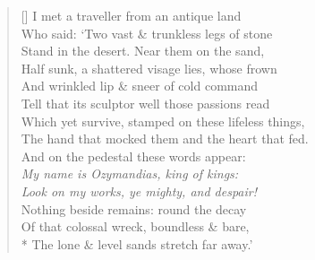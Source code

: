 \documentclass[MAIN]{subfiles}
\begin{document}
\settowidth{\versewidth}{I met a traveller from an antique land}
\begin{verse}[\versewidth]
I met a traveller from an antique land\\
Who said: `Two vast \& trunkless legs of stone\\
Stand in the desert. Near them on the sand,\\
Half sunk, a shattered visage lies, whose frown\\
And wrinkled lip \& sneer of cold command\\
Tell that its sculptor well those passions read\\
Which yet survive, stamped on these lifeless things,\\
The hand that mocked them and the heart that fed.\\
And on the pedestal these words appear:\\
{\it My name is \emph{Ozymandias}, king of kings:\\
Look on my works, ye mighty, and despair!}\\
Nothing beside remains: round the decay\\
Of that colossal wreck, boundless \& bare,\\*
The lone \& level sands stretch far away.'
\end{verse}
\end{document}
